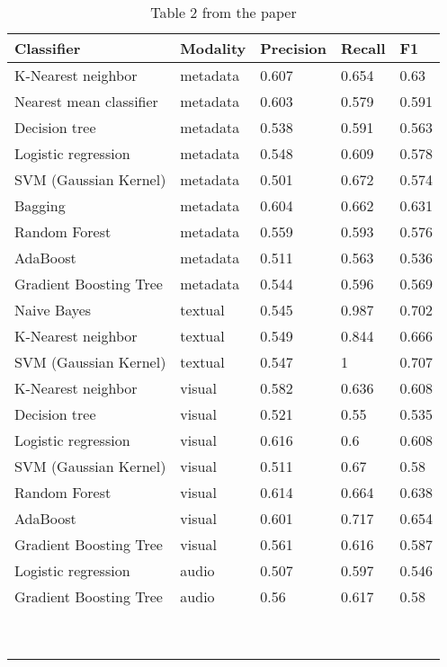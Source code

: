 \documentclass[sigconf]{acmart}
\begin{document}
\begin{table}[hbt!]
  \caption*{Table 2 from the paper}
  \begin{tabular}{lllll}
    \hline
    Classifier              & Modality & Precision & Recall & F1    \\ \hline
    K-Nearest neighbor      & metadata & 0.607     & 0.654  & 0.63  \\
    Nearest mean classifier & metadata & 0.603     & 0.579  & 0.591 \\
    Decision tree           & metadata & 0.538     & 0.591  & 0.563 \\
    Logistic regression     & metadata & 0.548     & 0.609  & 0.578 \\
    SVM (Gaussian Kernel)   & metadata & 0.501     & 0.672  & 0.574 \\
    Bagging                 & metadata & 0.604     & 0.662  & 0.631 \\
    Random Forest           & metadata & 0.559     & 0.593  & 0.576 \\
    AdaBoost                & metadata & 0.511     & 0.563  & 0.536 \\
    Gradient Boosting Tree  & metadata & 0.544     & 0.596  & 0.569 \\
    Naive Bayes             & textual  & 0.545     & 0.987  & 0.702 \\
    K-Nearest neighbor      & textual  & 0.549     & 0.844  & 0.666 \\
    SVM (Gaussian Kernel)   & textual  & 0.547     & 1      & 0.707 \\
    K-Nearest neighbor      & visual   & 0.582     & 0.636  & 0.608 \\
    Decision tree           & visual   & 0.521     & 0.55   & 0.535 \\
    Logistic regression     & visual   & 0.616     & 0.6    & 0.608 \\
    SVM (Gaussian Kernel)   & visual   & 0.511     & 0.67   & 0.58  \\
    Random Forest           & visual   & 0.614     & 0.664  & 0.638 \\
    AdaBoost                & visual   & 0.601     & 0.717  & 0.654 \\
    Gradient Boosting Tree  & visual   & 0.561     & 0.616  & 0.587 \\
    Logistic regression     & audio    & 0.507     & 0.597  & 0.546 \\
    Gradient Boosting Tree  & audio    & 0.56      & 0.617  & 0.58  \\ \hline
                            &          &           &        &       \\ &&&& \\ &&&& \\ &&&& \\ &&&& \\ &&&& \\ &&&& \\ &&&& \\ &&&& \\
  \end{tabular}
\end{table}
\end{document}
